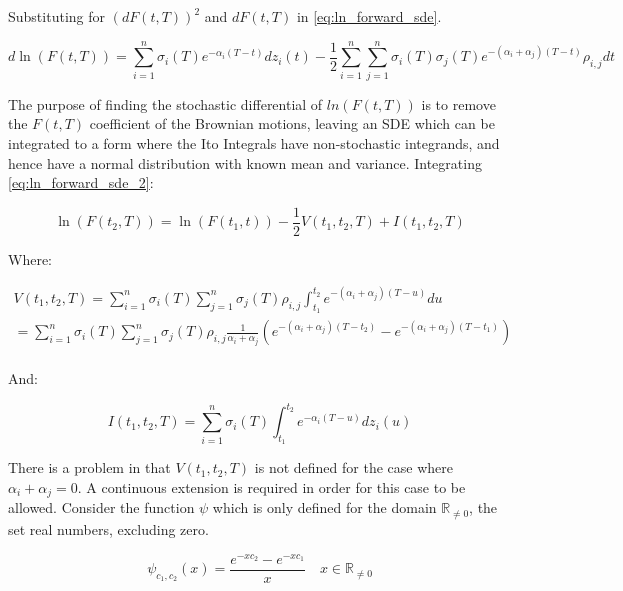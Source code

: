 \documentclass{article}
\begin{document}
Substituting for $(dF(t, T))^2$ and $dF(t, T)$ in \ref{eq:ln_forward_sde}.

\begin{equation}
    \label{eq:ln_forward_sde_2}
    d\ln(F(t, T)) = \sum_{i=1}^n \sigma_i(T)e^{-\alpha_i(T-t)}dz_i(t) - 
    \frac{1}{2} \sum_{i=1}^n \sum_{j=1}^n \sigma_i(T) \sigma_j(T)
    e^{-(\alpha_i + \alpha_j)(T-t)}\rho_{i,j}dt
\end{equation}

The purpose of finding the stochastic differential of $ln(F(t, T))$ is to remove the
$F(t, T)$ coefficient of the Brownian motions, leaving an SDE which can be integrated
to a form where the Ito Integrals have non-stochastic integrands, and hence have a normal
distribution with known mean and variance. Integrating \ref{eq:ln_forward_sde_2}:

\begin{equation}
    \ln(F(t_2, T)) = \ln(F(t_1, t)) - \frac{1}{2} V(t_1, t_2, T) + I(t_1, t_2, T)
\end{equation}

Where:

\begin{eqnarray}
    \label{eq:forward_drift_adjust}
    \nonumber
    V(t_1, t_2, T) =  \sum_{i=1}^n \sigma_i(T) \sum_{j=1}^n 
    \sigma_j(T) \rho_{i,j} \int_{t_1}^{t_2} e^{-(\alpha_i + \alpha_j)(T-u)} du\\
    = \sum_{i=1}^n \sigma_i(T) \sum_{j=1}^n \sigma_j(T) \rho_{i,j} 
    \frac{1}{\alpha_i + \alpha_j} (e^{-(\alpha_i + \alpha_j)(T-t_2)} - 
    e^{-(\alpha_i + \alpha_j)(T-t_1)}) \\
    \nonumber
\end{eqnarray}

And:

\begin{equation}
    I(t_1, t_2, T) = \sum_{i=1}^n \sigma_i(T) \int_{t_1}^{t_2} e^{-\alpha_i(T-u)}dz_i(u)
\end{equation}

\bigskip
There is a problem in that $V(t_1, t_2, T)$ is not defined for the case where 
$\alpha_i + \alpha_j = 0$. A continuous extension is required in order for this
case to be allowed. Consider the function $\psi$ which is only defined for 
the domain $\mathbb{R}_{\ne 0}$, the set real numbers, excluding zero.

\begin{equation}
    \psi_{c_1, c_2}(x) = \frac{e^{-x c_2} - e^{-x c_1}}{x} \quad  x \in \mathbb{R}_{\ne 0}
\end{equation}
\end{document}
